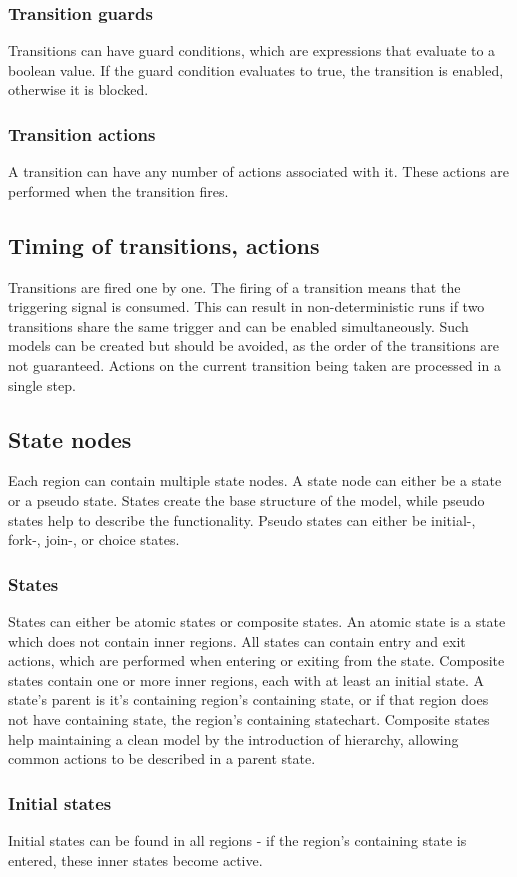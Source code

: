 {    \subsubsection{Transition guards}
Transitions can have guard conditions, which are expressions that evaluate to a boolean value. If the guard condition evaluates to true, the transition is enabled, otherwise it is blocked.
    \subsubsection{Transition actions}
A transition can have any number of actions associated with it. These actions are performed when the transition fires.
  \subsection{Timing of transitions, actions}
Transitions are fired one by one. The firing of a transition means that the triggering signal is consumed. This can result in non-deterministic runs if two transitions share the same trigger and can be enabled simultaneously. Such models can be created but should be avoided, as the order of the transitions are not guaranteed. Actions on the current transition being taken are processed in a single step.
  \subsection{State nodes}
Each region can contain multiple state nodes. A state node can either be a state or a pseudo state. States create the base structure of the model, while pseudo states help to describe the functionality. Pseudo states can either be initial-, fork-, join-, or choice states.
    \subsubsection{States}
States can either be atomic states or composite states. An atomic state is a state which does not contain inner regions. All states can contain entry and exit actions, which are performed when entering or exiting from the state. Composite states contain one or more inner regions, each with at least an initial state. A state's parent is it's containing region's containing state, or if that region does not have containing state, the region's containing statechart. Composite states help maintaining a clean model by the introduction of hierarchy, allowing common actions to be described in a parent state.
    \subsubsection{Initial states}
Initial states can be found in all regions - if the region's containing state is entered, these inner states become active.
}
